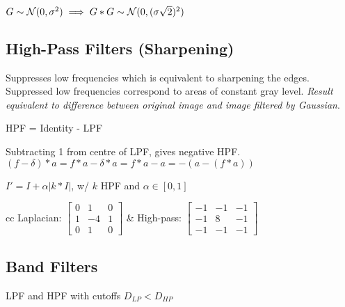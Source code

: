 \begin{theorem}
  \(G \sim \operatorname{\mathcal{N}}(0, \sigma^2) \implies G \ast G \sim \operatorname{\mathcal{N}}(0, (\sigma \sqrt{2})^2)\)
\end{theorem}

\subsection{High-Pass Filters (Sharpening)}
Suppresses low frequencies which is equivalent to sharpening the edges. Suppressed low frequencies correspond to areas of constant gray level. \textit{Result equivalent to difference between original image and image filtered by Gaussian}.

\begin{definition}[Construction]
  HPF = Identity - LPF
\end{definition}

\begin{theorem}
  Subtracting 1 from centre of LPF, gives negative HPF.
  \((f - \delta) \ast a = f \ast a - \delta \ast a = f \ast a - a = -(a - (f \ast a))\)
\end{theorem}

\begin{definition}
  \(I' = I + \alpha |k \ast I|\), w/ \(k\) HPF and \(\alpha \in [0, 1]\)
\end{definition}

\begin{tabularx}{\linewidth}{cc}
  Laplacian: \(\begin{bmatrix}
    0 & 1 & 0 \\
    1 & -4 & 1 \\
    0 & 1 & 0
  \end{bmatrix}\) & 
  High-pass: \(\begin{bmatrix}
    -1 & -1 & -1 \\
    -1 & 8 & -1 \\
    -1 & -1 & -1
  \end{bmatrix}\)
\end{tabularx}

\subsection{Band Filters}

\begin{definition}
  LPF and HPF with cutoffs \(D_{LP} < D_{HP}\)
\end{definition}

